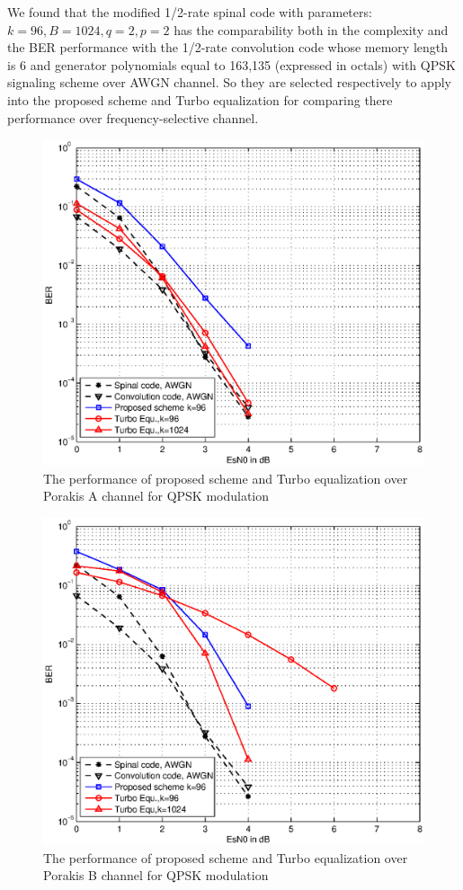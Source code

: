 \documentclass[conference]{IEEEtran}
\begin{document}
We found that the modified 1/2-rate spinal code with parameters: $k=96, B=1024, q=2, p=2$ has the comparability both in the complexity and the BER performance with the 1/2-rate convolution code whose memory length is 6 and generator polynomials equal to 163,135 (expressed in octals) with QPSK signaling scheme over AWGN channel. So they are selected respectively to apply into the proposed scheme and Turbo equalization for comparing there performance over frequency-selective channel.  
\begin{figure}[!t]
\centering
\includegraphics[width=3 in]{ChAQPSKComparison.eps}
\caption{The performance of proposed scheme and Turbo equalization over Porakis A channel for QPSK modulation}
\label{fig_ChAQPSKComparison}
\end{figure}

\begin{figure}[!t]
\centering
\includegraphics[width=3 in]{ChBQPSKComparison.eps}
\caption{The performance of proposed scheme and Turbo equalization over Porakis B channel for QPSK modulation}
\label{fig_ChBQPSKComparison}
\end{figure}
\end{document}
